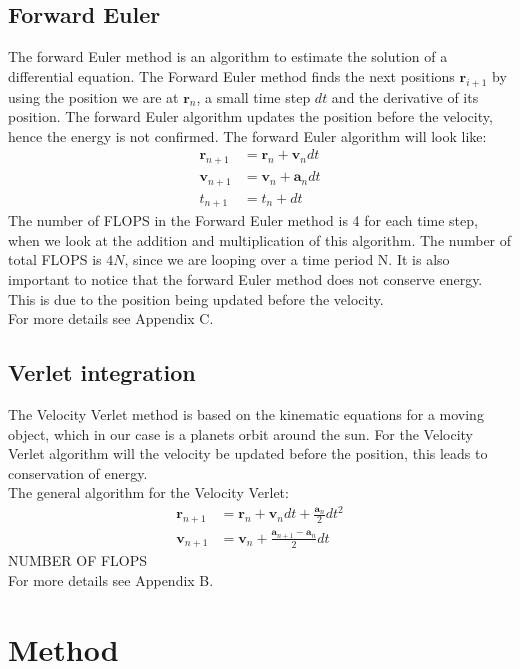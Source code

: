 \documentclass{article}
\begin{document}
\begin{multicols}{2}
\subsection{Forward Euler}
The forward Euler method is an algorithm to estimate the solution of a differential equation. The Forward Euler method  finds the next positions $\mathbf{r}_{i+1}$ by using the position we are at $\mathbf{r}_{n}$, a small time step $dt$ and the derivative of its position. The forward Euler algorithm updates the position before the velocity, hence the energy is not confirmed. 
The forward Euler algorithm will look like:
\begin{align*}
    \mathbf{r}_{n+1}&=\mathbf{r}_n+\mathbf{v}_ndt\\
    \mathbf{v}_{n+1}&=\mathbf{v}_n+\mathbf{a}_ndt\\
    t_{n+1}&=t_n + dt
\end{align*}
The number of FLOPS in the Forward Euler method is 4 for each time step, when we look at the addition and multiplication of this algorithm. The number of total FLOPS is $4N$, since we are looping over a time period N. It is also important to notice that the forward Euler method does not conserve energy. This is due to the position being updated before the velocity.  \\
For more details see Appendix C.
\\
\subsection{Verlet integration}
The Velocity Verlet method is based on the kinematic equations for a moving object, which in our case is a planets orbit around the sun. For the Velocity Verlet algorithm will the velocity be updated before the position, this leads to conservation of energy.\\   
The general algorithm for the Velocity Verlet:
\begin{align*}
    \mathbf{r}_{n+1}&=\mathbf{r}_n+\mathbf{v}_ndt+\frac{\mathbf{a}_n}{2}dt^2\\
    \mathbf{v}_{n+1}&=\mathbf{v}_n+\frac{\mathbf{a}_{n+1}-\mathbf{a}_n}{2}dt
\end{align*}
NUMBER OF FLOPS\\
For more details see Appendix B.

\section{Method}


\end{multicols}
\end{document}
